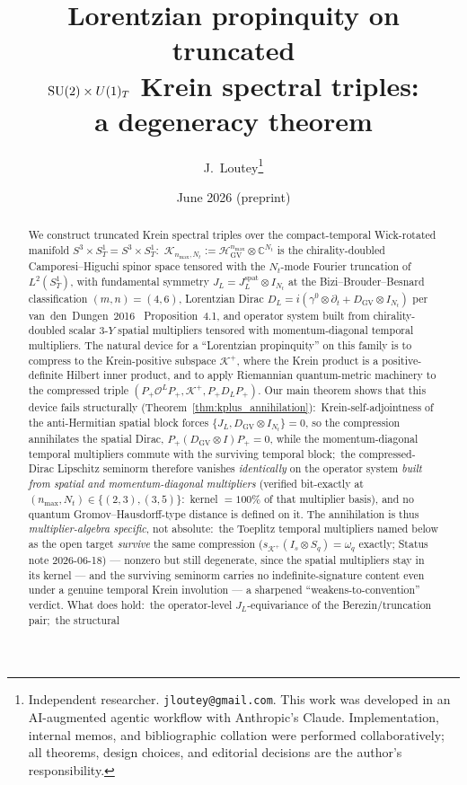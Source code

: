 \documentclass[11pt,a4paper]{article}
\title{Lorentzian propinquity on truncated\\
$\mathrm{SU}(2)\times U(1)_{T}$ Krein spectral triples:\\
a degeneracy theorem}
\author{J.~Loutey\thanks{Independent researcher. \texttt{jloutey@gmail.com}.
This work was developed in an AI-augmented agentic workflow with
Anthropic's Claude. Implementation, internal memos, and bibliographic
collation were performed collaboratively; all theorems, design choices,
and editorial decisions are the author's responsibility.}}
\date{June 2026 (preprint)}
\theoremstyle{plain}
\theoremstyle{definition}
\newcommand{\nmax}{n_{\max}}
\newcommand{\Nt}{N_{t}}
\newcommand{\sthree}{S^{3}}
\newcommand{\SoneT}{S^{1}_{T}}
\newcommand{\Manifold}{S^{3}\times S^{1}_{T}}
\newcommand{\Krein}{\mathcal{K}}
\newcommand{\Op}{\mathcal{O}}
\newcommand{\C}{\mathbb{C}}
\newcommand{\DGV}{D_{\mathrm{GV}}}
\newcommand{\DL}{D_{L}}
\newcommand{\JL}{J_{L}}
\newcommand{\HGV}{\mathcal{H}_{\mathrm{GV}}}
\newcommand{\Kplus}{\Krein^{+}}
\newcommand{\Pplus}{P_{+}}
\newcommand{\spat}{\mathrm{spat}}
\begin{document}
\maketitle

\begin{abstract}
We construct truncated Krein spectral triples over the compact-temporal
Wick-rotated manifold $\Manifold = \sthree \times \SoneT$:\
$\Krein_{\nmax,\Nt} := \HGV^{\nmax} \otimes \C^{\Nt}$ is the
chirality-doubled Camporesi--Higuchi spinor space tensored with the
$\Nt$-mode Fourier truncation of $L^{2}(\SoneT)$, with fundamental
symmetry $\JL = \JL^{\spat} \otimes I_{\Nt}$ at the
Bizi--Brouder--Besnard~\cite{bizi_brouder_besnard2018} classification
$(m, n) = (4, 6)$, Lorentzian Dirac
$\DL = i(\gamma^{0} \otimes \partial_{t} + \DGV \otimes I_{\Nt})$
per van~den~Dungen~2016~\cite{vandungen2016} Proposition~4.1, and
operator system built from chirality-doubled scalar $3$-$Y$ spatial
multipliers tensored with momentum-diagonal temporal multipliers.
The natural device for a ``Lorentzian propinquity'' on this family is
to compress to the Krein-positive subspace $\Kplus$, where the Krein
product is a positive-definite Hilbert inner product, and to apply
Riemannian quantum-metric machinery to the compressed triple
$(\Pplus\Op^{L}\Pplus, \Kplus, \Pplus\DL\Pplus)$. Our main theorem
shows that this device fails structurally
(Theorem~\ref{thm:kplus_annihilation}):\ Krein-self-adjointness of
the anti-Hermitian spatial block forces
$\{\JL, \DGV \otimes I_{\Nt}\} = 0$, so the compression annihilates
the spatial Dirac, $\Pplus(\DGV \otimes I)\Pplus = 0$, while the
momentum-diagonal temporal multipliers commute with the surviving
temporal block;\ the compressed-Dirac Lipschitz seminorm therefore
vanishes \emph{identically} on the operator system \emph{built from
spatial and momentum-diagonal multipliers} (verified bit-exactly at
$(\nmax, \Nt) \in \{(2,3), (3,5)\}$:\ kernel $= 100\%$ of that
multiplier basis), and no quantum Gromov--Hausdorff-type distance is
defined on it. The annihilation is thus \emph{multiplier-algebra
specific}, not absolute:\ the Toeplitz temporal multipliers named below
as the open target \emph{survive} the same compression
($s_{\Kplus}(I_s \otimes S_q) = \omega_q$ exactly; Status note
2026-06-18) --- nonzero but still degenerate, since the spatial
multipliers stay in its kernel --- and the surviving seminorm carries no indefinite-signature
content even under a genuine temporal Krein involution --- a sharpened
``weakens-to-convention'' verdict. What does hold:\ the operator-level
$\JL$-equivariance of the Berezin/truncation pair;\ the structural

\end{abstract}
\end{document}
